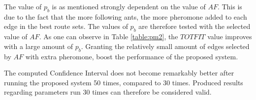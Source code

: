 The value of $p_b$ is as mentioned strongly dependent on the value of $AF$. This is due to the fact that the more following ants, the more pheromone added to each edge in the best route sets. The values of $p_b$ are therefore tested with the selected value of $AF$. As one can observe in Table \vref{table:pm2}, the $TOTFIT$ value improves with a large amount of $p_b$. Granting the relatively small amount of edges selected by $AF$ with extra pheromone, boost the performance of the proposed system. 
\newline

The computed Confidence Interval does not become remarkably better after running the proposed system 50 times, compared to 30 times. Produced results regarding parameters run 30 times can therefore be considered valid.

